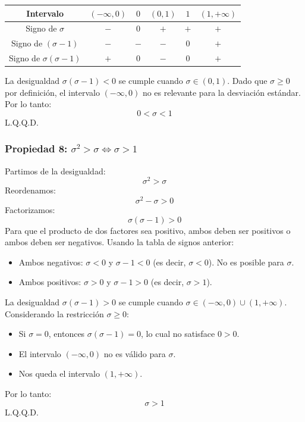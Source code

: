 \documentclass[12pt, letterpaper]{article}
\begin{document}
\begin{center}
	\begin{tabular}{c|ccccc}
		Intervalo                   & $(-\infty, 0)$ & $0$ & $(0, 1)$ & $1$ & $(1, +\infty)$ \\
		\hline
		Signo de $\sigma$           & $-$            & $0$ & $+$      & $+$ & $+$            \\
		Signo de $(\sigma-1)$       & $-$            & $-$ & $-$      & $0$ & $+$            \\
		\hline
		Signo de $\sigma(\sigma-1)$ & $+$            & $0$ & $-$      & $0$ & $+$            \\
	\end{tabular}
\end{center}

La desigualdad $\sigma(\sigma-1) < 0$ se cumple cuando $\sigma \in (0, 1)$.
Dado que $\sigma \ge 0$ por definición, el intervalo $(-\infty, 0)$ no es relevante para la desviación estándar.
Por lo tanto:
\[0 < \sigma < 1 \]
L.Q.Q.D.

\subsubsection{Propiedad 8: $\sigma^2 > \sigma \iff \sigma > 1$}
Partimos de la desigualdad:
\[\sigma^2 > \sigma \]
Reordenamos:
\[\sigma^2-\sigma > 0 \]
Factorizamos:
\[\sigma(\sigma-1) > 0 \]
Para que el producto de dos factores sea positivo, ambos deben ser positivos o ambos deben ser negativos. Usando la tabla de signos anterior:
\begin{itemize}
	\item Ambos negativos: $\sigma < 0$ y $\sigma-1 < 0$ (es decir, $\sigma < 0$). No es posible para $\sigma$.
	\item Ambos positivos: $\sigma > 0$ y $\sigma-1 > 0$ (es decir, $\sigma > 1$).
\end{itemize}
La desigualdad $\sigma(\sigma-1) > 0$ se cumple cuando $\sigma \in (-\infty, 0) \cup (1, +\infty)$.
Considerando la restricción $\sigma \ge 0$:
\begin{itemize}
	\item Si $\sigma=0$, entonces $\sigma(\sigma-1)=0$, lo cual no satisface $0>0$.
	\item El intervalo $(-\infty,0)$ no es válido para $\sigma$.
	\item Nos queda el intervalo $(1, +\infty)$.
\end{itemize}
Por lo tanto:
\[\sigma > 1\]
L.Q.Q.D.
\newpage
\end{document}
